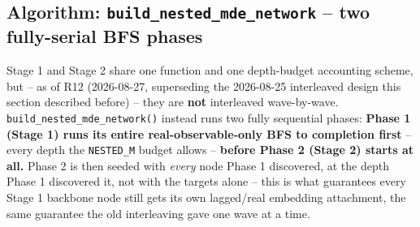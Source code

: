 \documentclass[11pt]{article}
\begin{document}
\subsection{Algorithm: \texttt{build\_nested\_mde\_network} -- two fully-serial BFS phases}
\label{sec:stage1-algo}
Stage 1 and Stage 2 share one function and one depth-budget accounting scheme, but -- as of R12 (2026-08-27, superseding the 2026-08-25 interleaved design this section described before) -- they are \textbf{not} interleaved wave-by-wave. \texttt{build\_nested\_mde\_network()} instead runs two fully sequential phases: \textbf{Phase 1 (Stage 1) runs its entire real-observable-only BFS to completion first} -- every depth the \texttt{NESTED\_M} budget allows -- \textbf{before Phase 2 (Stage 2) starts at all.} Phase 2 is then seeded with \emph{every} node Phase 1 discovered, at the depth Phase 1 discovered it, not with the targets alone -- this is what guarantees every Stage 1 backbone node still gets its own lagged/real embedding attachment, the same guarantee the old interleaving gave one wave at a time.
\end{document}
